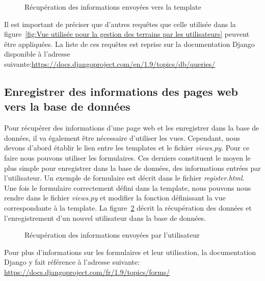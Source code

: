 \begin{figure}[!ht]
\centering
\begin{framed}

\end{framed}
\caption{Récupération des informations envoyées vers la template}
\label{fig:Récupération des informations envoyées vers la template}
\end{figure}
\FloatBarrier

Il est important de préciser que d'autres requêtes que celle utilisée dans la figure~\ref{fig:Vue utilisée pour la gestion des terrains par les utilisateurs} peuvent être appliquées. La liste de ces requêtes est reprise sur la documentation Django disponible à l'adresse suivante:\url{https://docs.djangoproject.com/en/1.9/topics/db/queries/}

\subsection{Enregistrer des informations des pages web vers la base de données}

Pour récupérer des informations d'une page web et les enregistrer dans la base de données, il va également être nécessaire d'utiliser les vues. Cependant, nous devons d'abord établir le lien entre les templates et le fichier \textit{views.py}. Pour ce faire nous pouvons utiliser les formulaires. Ces derniers constituent le moyen le plus simple pour enregistrer dans la base de données, des informations entrées par l'utilisateur. Un exemple de formulaire est décrit dans le fichier \textit{register.html}.\\

Une fois le formulaire correctement défini dans la template, nous pouvons nous rendre dans le fichier \textit{views.py} et modifier la fonction définissant la vue correspondante à la template. La figure~\ref{fig:Récupération des informations envoyées par l'utilisateur} décrit la récupération des données et l'enregistrement d'un nouvel utilisateur dans la base de données. 

\begin{figure}[!ht]
\centering
\begin{framed}

\end{framed}
\caption{Récupération des informations envoyées par l'utilisateur}
\label{fig:Récupération des informations envoyées par l'utilisateur}
\end{figure}
\FloatBarrier

Pour plus d'informations sur les formulaires et leur utilisation, la documentation Django y fait référence à l'adresse suivante: \url{https://docs.djangoproject.com/fr/1.9/topics/forms/}